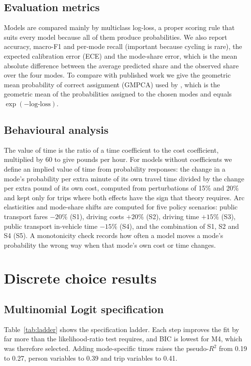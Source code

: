 \documentclass[11pt,a4paper]{article}
\begin{document}
\subsection{Evaluation metrics}
Models are compared mainly by multiclass log-loss, a proper scoring rule that suits every model because all of them produce probabilities. We also report accuracy, macro-F1 and per-mode recall (important because cycling is rare), the expected calibration error (ECE) and the mode-share error, which is the mean absolute difference between the average predicted share and the observed share over the four modes. To compare with published work we give the geometric mean probability of correct assignment (GMPCA) used by \citet{martinbaos2023}, which is the geometric mean of the probabilities assigned to the chosen modes and equals $\exp(-\text{log-loss})$.

\subsection{Behavioural analysis}
The value of time is the ratio of a time coefficient to the cost coefficient, multiplied by 60 to give pounds per hour. For models without coefficients we define an implied value of time from probability responses: the change in a mode's probability per extra minute of its own travel time divided by the change per extra pound of its own cost, computed from perturbations of 15\% and 20\% and kept only for trips where both effects have the sign that theory requires. Arc elasticities and mode-share shifts are computed for five policy scenarios: public transport fares $-20\%$ (S1), driving costs $+20\%$ (S2), driving time $+15\%$ (S3), public transport in-vehicle time $-15\%$ (S4), and the combination of S1, S2 and S4 (S5). A monotonicity check records how often a model moves a mode's probability the wrong way when that mode's own cost or time changes.

\section{Discrete choice results}
\label{sec:dcm}

\subsection{Multinomial Logit specification}
Table~\ref{tab:ladder} shows the specification ladder. Each step improves the fit by far more than the likelihood-ratio test requires, and BIC is lowest for M4, which was therefore selected. Adding mode-specific times raises the pseudo-$R^2$ from 0.19 to 0.27, person variables to 0.39 and trip variables to 0.41.
\end{document}

